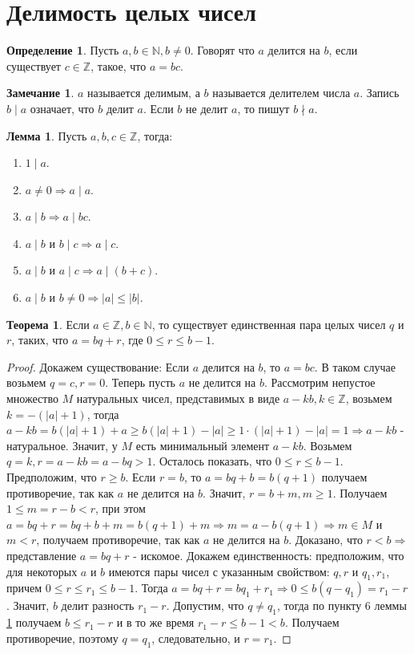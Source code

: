 \documentclass[a4paper, 12pt]{article}
\newcommand{\N}{\mathbb{N}}
\newcommand{\Z}{\mathbb{Z}}
\newcommand{\ndiv}{\nmid}
\theoremstyle{definition}
\newtheorem{definition}{Определение}[section]
\newtheorem{theorem}{Теорема}[section]
\newtheorem{lemma}{Лемма}[section]
\newtheorem*{comm}{Замечание}
\begin{document}
    \section{Делимость целых чисел}
    \begin{definition}
        Пусть $a,b\in \mathbb{N}, b\ne 0$. Говорят что $a$ делится на $b$, если существует $c\in \mathbb{Z}$, такое, что $a=bc$.
    \end{definition}
    \begin{comm}
        $a$ называется делимым, а $b$ называется делителем числа $a$. Запись $b \mid a$ означает, что $b$ делит $a$. Если $b$ не делит $a$, то пишут $b\ndiv a$.
    \end{comm}
    \begin{lemma} \label{lemma1.1}
        Пусть $a,b,c \in \mathbb{Z}$, тогда:
        \begin{enumerate}
            \item $1 \mid a$.
            \item $a\ne 0 \Rightarrow a\mid a$.
            \item $a\mid b \Rightarrow a\mid bc$.
            \item $a\mid b$ и $b\mid c \Rightarrow a\mid c$.
            \item $a\mid b$ и $a\mid c \Rightarrow a\mid (b+c)$.
            \item $a\mid b$ и $b\ne 0 \Rightarrow |a|\leq|b|$.
        \end{enumerate}
    \end{lemma}
    \begin{theorem} \label{th1.1}
        Если $a\in \Z, b\in \N$, то существует единственная пара целых чисел $q$ и $r$, таких, что $a=bq+r$, где $0\leq r\leq b-1$. 
    \end{theorem}
    \begin{proof}
        Докажем существование: Если $a$ делится на $b$, то $a=bc$. В таком случае возьмем $q=c, r=0$. Теперь пусть $a$ не делится на $b$. Рассмотрим непустое множество $M$ натуральных чисел, представимых в виде $a-kb, k\in \mathbb{Z}$, возьмем $k=-(|a|+1)$, тогда $a-kb=b(|a|+1)+a\geq b(|a|+1)-|a|\geq 1\cdot (|a|+1)-|a|=1 \Rightarrow a-kb$ - натуральное. Значит, у $M$ есть минимальный элемент $a-kb$. Возьмем $q=k, r=a-kb=a-bq > 1$. Осталось показать, что $0\leq r\leq b-1$. Предположим, что $r\geq b$. Если $r=b$, то $a=bq+b=b(q+1)$ получаем противоречие, так как $a$ не делится на $b$. Значит, $r=b+m, m\geq 1$. Получаем $1\leq m=r-b<r$, при этом $a=bq+r=bq+b+m=b(q+1)+m \Rightarrow m=a-b(q+1) \Rightarrow m\in M$ и $m<r$, получаем противоречие, так как $a$ не делится на $b$. Доказано, что $r<b \Rightarrow$ представление $a=bq+r$ - искомое. Докажем единственность: предположим, что для некоторых $a$ и $b$ имеются пары чисел с указанным свойством: $q,r$ и $q_1,r_1$, причем $0\leq r\leq r_1 \leq b-1$. Тогда $a=bq+r=bq_1+r_1\Rightarrow 0\leq b(q-q_1)=r_1-r$. Значит, $b$ делит разность $r_1-r$. Допустим, что $q\ne q_1$, тогда по пункту 6 леммы \ref{lemma1.1} получаем $b\leq r_1-r$ и в то же время $r_1-r\leq b-1<b$. Получаем противоречие, поэтому $q=q_1$, следовательно, и $r=r_1$.
    \end{proof}
\end{document}
